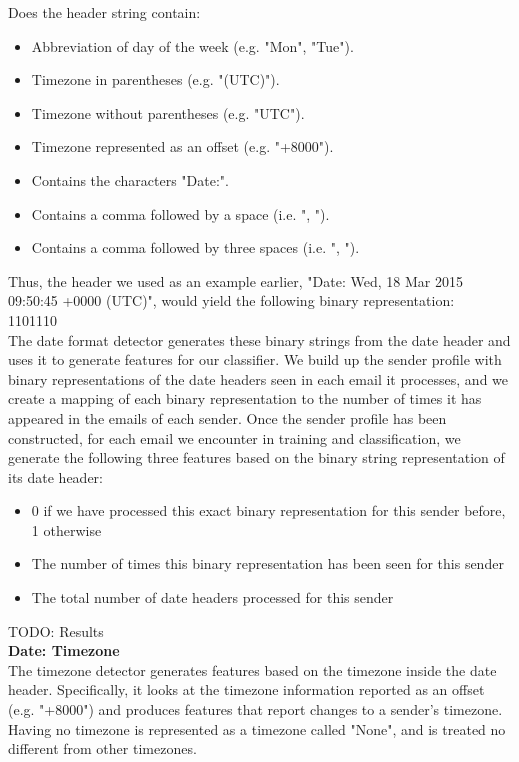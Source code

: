 \documentclass[letterpaper]{article}
\begin{document}
Does the header string contain:

\begin{itemize}
\item Abbreviation of day of the week (e.g. "Mon", "Tue").
\item Timezone in parentheses (e.g. "(UTC)").
\item Timezone without parentheses (e.g. "UTC").
\item Timezone represented as an offset (e.g. "+8000").
\item Contains the characters "Date:".
\item Contains a comma followed by a space (i.e. ", ").
\item Contains a comma followed by three spaces (i.e. ",   ").
\end{itemize}

Thus, the header we used as an example earlier, "Date: Wed, 18 Mar 2015 09:50:45 +0000 (UTC)", would yield the following binary representation:\\

1101110\\

The date format detector generates these binary strings from the date header and uses it to generate features for our classifier. We build up the sender profile with binary representations of the date headers seen in each email it processes, and we create a mapping of each binary representation to the number of times it has appeared in the emails of each sender. Once the sender profile has been constructed, for each email we encounter in training and classification, we generate the following three features based on the binary string representation of its date header:

\begin{itemize}
\item  0 if we have processed this exact binary representation for this sender before, 1 otherwise
\item The number of times this binary representation has been seen for this sender
\item The total number of date headers processed for this sender
\end{itemize}

TODO: Results\\

\textbf{Date: Timezone}\\

The timezone detector generates features based on the timezone inside the date header. Specifically, it looks at the timezone information reported as an offset (e.g. "+8000") and produces features that report changes to a sender's timezone. Having no timezone is represented as a timezone called "None", and is treated no different from other timezones.
\end{document}
